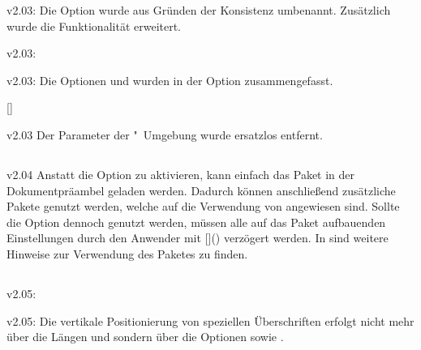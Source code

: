 \begin{Obsolete}{v2.03:}{}
\printobsoletelist%
%
Die Option  wurde aus Gründen der Konsistenz umbenannt. 
Zusätzlich wurde die Funktionalität erweitert.
\end{Obsolete}

\begin{Obsolete}{v2.03:}{}
\begin{Obsolete}{v2.03:}{}
\printobsoletelist%
%
Die Optionen  und  wurden in der Option 
 zusammengefasst.
\end{Obsolete}
\end{Obsolete}

\begin{Obsolete}{}{[]}
\begin{Obsolete}{v2.03}{}
\printobsoletelist%
%
Der Parameter  der 
"~Umgebung wurde ersatzlos entfernt.
\end{Obsolete}
\end{Obsolete}


\subsection{}
\begin{Obsolete}{v2.04}{}%
\printobsoletelist%
%
Anstatt die Option  zu aktivieren, kann einfach das Paket 
 in der Dokumentpräambel geladen werden. Dadurch können 
anschließend zusätzliche Pakete genutzt werden, welche auf die Verwendung von 
 angewiesen sind. Sollte die Option  
dennoch genutzt werden, müssen alle auf das Paket  
aufbauenden Einstellungen durch den Anwender mit %
[\PParameter{\dots}]() verzögert 
werden. In  sind weitere Hinweise zur Verwendung des Paketes 
 zu finden.
\end{Obsolete}


\subsection{}
\begin{Obsolete}{v2.05:}{}
\begin{Obsolete}{v2.05:}{}
\printobsoletelist%
%
Die vertikale Positionierung von speziellen Überschriften erfolgt nicht mehr 
über die Längen  und  sondern 
über die Optionen  sowie .
\end{Obsolete}
\end{Obsolete}


